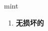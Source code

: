 
\begin{frame}
{\huge mint}
\begin{center}
\begin{enumerate}\Large
  \item \textbf{无损坏的}
\end{enumerate}
\end{center}
\end{frame}
